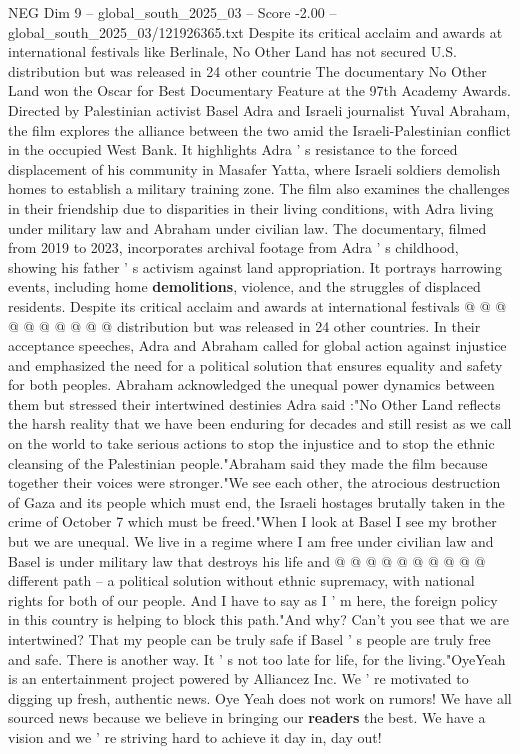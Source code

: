 \begin{textsample}{NEG Dim 9 – global\_south\_2025\_03 – Score -2.00 – global\_south\_2025\_03/121926365.txt}  \label{ex:f9_neg_318}
Despite its critical acclaim and awards at international festivals like Berlinale, No Other Land has not secured U.S. distribution but was released in 24 other countrie The documentary No Other Land won the Oscar for Best Documentary Feature at the 97th Academy Awards.
Directed by Palestinian activist Basel Adra and Israeli journalist Yuval Abraham, the film explores the alliance between the two amid the Israeli-Palestinian conflict in the occupied West Bank.
It highlights Adra ' s resistance to the forced displacement of his community in Masafer Yatta, where Israeli soldiers demolish homes to establish a military training zone.
The film also examines the challenges in their friendship due to disparities in their living conditions, with Adra living under military law and Abraham under civilian law.
The documentary, filmed from 2019 to 2023, incorporates archival footage from Adra ' s childhood, showing his father ' s activism against land appropriation.
It portrays harrowing events, including home \textbf{demolitions}, violence, and the struggles of displaced residents.
Despite its critical acclaim and awards at international festivals @ @ @ @ @ @ @ @ @ @ distribution but was released in 24 other countries.
In their acceptance speeches, Adra and Abraham called for global action against injustice and emphasized the need for a political solution that ensures equality and safety for both peoples.
Abraham acknowledged the unequal power dynamics between them but stressed their intertwined destinies Adra said :"No Other Land reflects the harsh reality that we have been enduring for decades and still resist as we call on the world to take serious actions to stop the injustice and to stop the ethnic cleansing of the Palestinian people."Abraham said they made the film because together their voices were stronger."We see each other, the atrocious destruction of Gaza and its people which must end, the Israeli hostages brutally taken in the crime of October 7 which must be freed."When I look at Basel I see my brother but we are unequal.
We live in a regime where I am free under civilian law and Basel is under military law that destroys his life and @ @ @ @ @ @ @ @ @ @ different path -- a political solution without ethnic supremacy, with national rights for both of our people.
And I have to say as I ' m here, the foreign policy in this country is helping to block this path."And why?
Can't you see that we are intertwined?
That my people can be truly safe if Basel ' s people are truly free and safe.
There is another way.
It ' s not too late for life, for the living."OyeYeah is an entertainment project powered by Alliancez Inc.
We ' re motivated to digging up fresh, authentic news.
Oye Yeah does not work on rumors!
We have all sourced news because we believe in bringing our \textbf{readers} the best.
We have a vision and we ' re striving hard to achieve it day in, day out!

\end{textsample}
